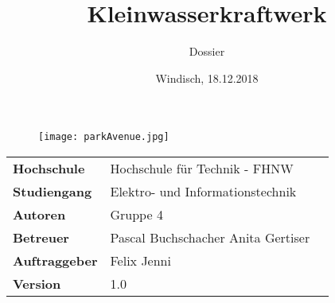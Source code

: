 \documentclass[final]{fhnwreport}       %
\title{Kleinwasserkraftwerk}          	%
\author{Dossier}          		%
\date{Windisch, 18.12.2018}             %
\begin{document}
\maketitle

\vspace*{-1cm}						    %
\vfill
\begin{figure} [H]
	\centering
	\texttt{[image: parkAvenue.jpg]}
	\label{fig:Park_Avenue_432}
\end{figure}
\vfill

{
\renewcommand\arraystretch{2}
\begin{center}
\begin{tabular}{ >{\bf} l p{10cm} l }
Hochschule&Hochschule für Technik - FHNW\\
Studiengang&Elektro- und Informationstechnik\\
Autoren&Gruppe 4\\%
Betreuer&Pascal Buchschacher \newline Anita Gertiser\\
Auftraggeber&Felix Jenni\\
Version&1.0 %
\end{tabular}
\end{center}
}

\clearpage




\end{document}
